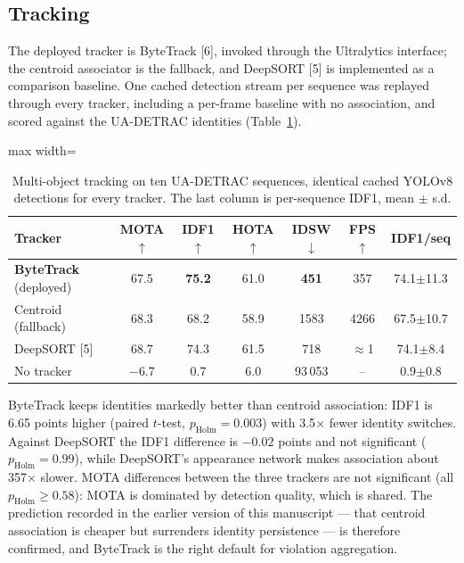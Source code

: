 \documentclass[10pt,a4paper,twocolumn]{article}
\begin{document}
\subsection{Tracking}
The deployed tracker is ByteTrack [6], invoked through the Ultralytics interface; the centroid associator is the
fallback, and DeepSORT [5] is implemented as a comparison baseline. One cached detection stream per sequence was
replayed through every tracker, including a per-frame baseline with no association, and scored against the
UA-DETRAC identities (Table~\ref{tab:mot}).

\begin{table}[t]
\centering\scriptsize
\caption{Multi-object tracking on ten UA-DETRAC sequences, identical cached YOLOv8 detections for every tracker. The
last column is per-sequence IDF1, mean $\pm$ s.d.}\label{tab:mot}
\setlength{\tabcolsep}{2.5pt}
\begin{adjustbox}{max width=\columnwidth}
\begin{tabular}{@{}lcccccc@{}}
\toprule
Tracker & MOTA$\uparrow$ & IDF1$\uparrow$ & HOTA$\uparrow$ & IDSW$\downarrow$ & FPS$\uparrow$ & IDF1/seq\\
\midrule
\textbf{ByteTrack} (deployed) & 67.5 & \textbf{75.2} & 61.0 & \textbf{451} & 357 & 74.1$\pm$11.3\\
Centroid (fallback) & 68.3 & 68.2 & 58.9 & 1583 & 4266 & 67.5$\pm$10.7\\
DeepSORT [5] & 68.7 & 74.3 & 61.5 & 718 & $\approx$1 & 74.1$\pm$8.4\\
No tracker & $-$6.7 & 0.7 & 6.0 & 93\,053 & -- & 0.9$\pm$0.8\\
\bottomrule
\end{tabular}
\end{adjustbox}
\end{table}

ByteTrack keeps identities markedly better than centroid association: IDF1 is 6.65 points higher (paired $t$-test,
$p_\mathrm{Holm}=0.003$) with 3.5$\times$ fewer identity switches. Against DeepSORT the IDF1 difference is $-0.02$
points and not significant ($p_\mathrm{Holm}=0.99$), while DeepSORT's appearance network makes association about
357$\times$ slower. MOTA differences between the three trackers are not significant (all $p_\mathrm{Holm}\geq0.58$):
MOTA is dominated by detection quality, which is shared. The prediction recorded in the earlier version of this
manuscript --- that centroid association is cheaper but surrenders identity persistence --- is therefore confirmed,
and ByteTrack is the right default for violation aggregation.
\end{document}
